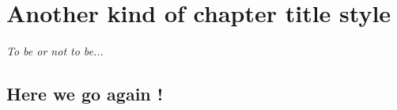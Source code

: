 \chapter{Another kind of chapter title style}
\label{chap:another_kind_of_chapter_title}
\begin{flushright}
\textit{To be or not to be...}
\end{flushright}
\newpage
\section{Here we go again !}
\lipsum[1]